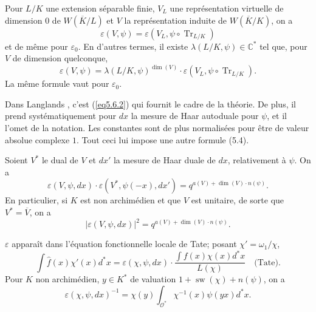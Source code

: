 \documentclass[11pt,a4paper]{amsart}
\theoremstyle{plain}
\theoremstyle{definition}
\DeclareMathOperator{\Tr}{Tr}
\newcommand{\dbC}{\mathbb{C}}
\DeclareMathOperator{\sw}{sw}
\def\dim{\mathop{\mathrm{dim}}\nolimits}
\newenvironment{para}{\par\noindent}{\par}
\newcommand{\scrO}{\mathscr{O}}
\newcommand{\ov}[1]{\overline{#1}}
\newcommand{\eps}{\varepsilon}
\newcommand{\wh}{\widehat}
\begin{document}
\begin{para}
Pour $L/K$ une extension s\'eparable finie, $V_{L}$ une repr\'esentation virtuelle de dimension $0$ de $W(\ov{K}/L)$ et $V$ la repr\'esentation induite de $W(\ov{K}/K)$, on a
\begin{equation}\label{eq5.6.1}
\eps(V,\psi) = \eps(V_{L}, \psi \circ \Tr_{L/K})
\end{equation}
et de m\^eme pour $\eps_{0}$. En d'autres termes, il existe $\lambda(L/K,\psi) \in \dbC^{*}$ tel que, pour $V$ de dimension quelconque,
\begin{equation}\label{eq5.6.2}
\eps(V,\psi) = \lambda(L/K,\psi)^{\dim(V)} \cdot \eps(V_{L}, \psi \circ \Tr_{L/K}).
\end{equation}
La m\^eme formule vaut pour $\eps_{0}$.

Dans Langlands \cite{9}, c'est (\ref{eq5.6.2}) qui fournit le cadre de la th\'eorie. De plus, il prend syst\'ematiquement pour $dx$ la mesure de Haar autoduale pour $\psi$, et il l'omet de la notation. Les constantes sont de plus normalis\'ees pour \^etre de valeur absolue complexe $1$. Tout ceci lui impose une autre formule (5.4).
\end{para}

\begin{para}
Soient $V^{*}$ le dual de $V$ et $dx'$ la mesure de Haar duale de $dx$, relativement \`a $\psi$. On a
\begin{equation}\label{eq5.7.1}
\eps(V,\psi,dx) \cdot \eps(V^{*}, \psi(-x), dx') = q^{a(V)+\dim(V) \cdot n(\psi)}.
\end{equation}
En particulier, si $K$ est non archim\'edien et que $V$ est unitaire, de sorte que $V^{*} = \ov{V}$, on a
\begin{equation}\label{eq5.7.2}
|\eps(V,\psi,dx)|^{2} = q^{a(V)+\dim(V) \cdot n(\psi)}.
\end{equation}
\end{para}

\begin{para}
$\eps$ appara\^it dans l'\'equation fonctionnelle locale de Tate; posant $\chi' = \omega_{1}/\chi$,
\begin{equation}\label{eq5.8.1}
\int \wh{f}(x) \chi'(x) d^{*}x = \eps(\chi,\psi,dx) \cdot \frac{\int f(x) \chi(x) d^{*}x}{L(\chi)} \quad \text{(Tate)}.
\end{equation}
Pour $K$ non archim\'edien, $y \in K^{*}$ de valuation $1+\sw(\chi)+n(\psi)$, on a
\begin{equation}\label{eq5.8.2}
\eps(\chi,\psi,dx)^{-1} = \chi(y) \int_{\scrO^{*}} \chi^{-1}(x) \psi(yx) d^{*}x.
\end{equation}
\end{para}
\end{document}
